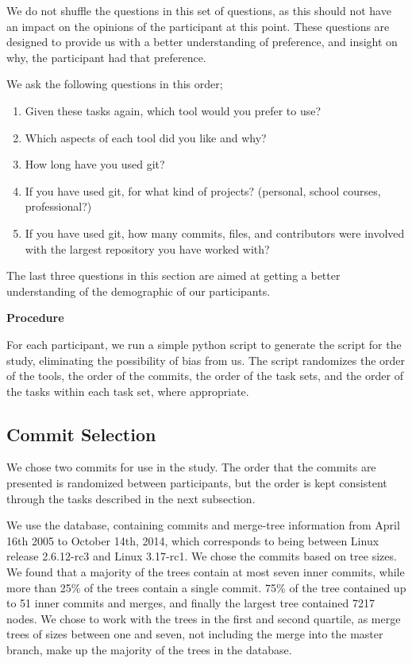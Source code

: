 \documentclass[draft]{IEEEtran}
\begin{document}
We do not shuffle the questions in this set of questions, as this should
not have an impact on the opinions of the participant at this point.
These questions are designed to provide us with a better understanding
of preference, and insight on why, the participant had that preference.

We ask the following questions in this order;

\begin{enumerate}
  \item Given these tasks again, which tool would you prefer to use?
  \item Which aspects of each tool did you like and why?
  \item How long have you used git?
  \item If you have used git, for what kind of projects? (personal,
    school courses, professional?)
  \item If you have used git, how many commits, files, and contributors
    were involved with the largest repository you have worked with?
\end{enumerate}

The last three questions in this section are aimed at getting a better
understanding of the demographic of our participants.

\textbf{Procedure}

For each participant, we run a simple python script to generate the
script for the study, eliminating the possibility of bias from us. The
script randomizes the order of the tools, the order of the commits, the
order of the task sets, and the order of the tasks within each task set,
where appropriate.


\subsection{Commit Selection}
\label{sub:commit_selection}

We chose two commits for use in the study. The order that the commits
are presented is randomized between participants, but the order is kept
consistent through the tasks described in the next subsection.

We use the \tool database, containing commits and merge-tree information
from April 16th 2005 to October 14th, 2014, which corresponds to being
between Linux release 2.6.12-rc3 and Linux 3.17-rc1.  We chose the commits based on tree sizes. We
found that a majority of the trees contain at most seven inner commits,
while more than 25\% of the trees contain a single commit. 75\% of the
tree contained up to 51 inner commits and merges, and finally the
largest tree contained 7217 nodes. We chose to work with the trees in
the first and second quartile, as merge trees of sizes between one and
seven, not including the merge into the master branch, make up the
majority of the trees in the database.
\end{document}
